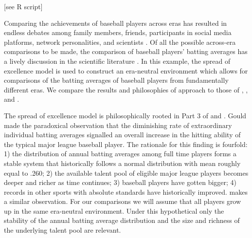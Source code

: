 \documentclass[11pt]{article}
\begin{document}
[see R script] \vspace{0.5cm}

Comparing the achievements of baseball players across eras has resulted in endless debates among family members, friends, participants in social media platforms, network personalities, and scientists \citep{gould1996full, berry1999bridging, schell2005baseball, petersen2011methods, eck2020challenging}. Of all the possible across-era comparisons to be made, the comparison of baseball players' batting averages has a lively discussion in the scientific literature \citep{gould1996full, berry1999bridging, schell2005baseball}. In this example, the spread of excellence model is used to construct an era-neutral environment which allows for comparisons of the batting averages of baseball players from fundamentally different eras. We compare the results and philosophies of approach to those of \cite{gould1996full}, \cite{berry1999bridging}, \cite{schell2005baseball} and \cite{petersen2011methods}.

The spread of excellence model is philosophically rooted in Part 3 of \cite{gould1996full} and \cite{eck2020challenging}. Gould made the paradoxical observation that the diminishing rate of extraordinary individual batting averages signalled an overall increase in the hitting ability of the typical major league baseball player. The rationale for this finding is fourfold: 1) the distribution of annual batting averages among full time players forms a stable system that historically follows a normal distribution with mean roughly equal to .260; 2) the available talent pool of eligible major league players becomes deeper and richer as time continues; 3) baseball players have gotten bigger; 4) records in other sports with absolute standards have historically improved. \cite{schell2005baseball} makes a similar observation. For our comparisons we will assume that all players grow up in the same era-neutral environment. Under this hypothetical only the stability of the annual batting average distribution and the size and richness of the underlying talent pool are relevant. 
\end{document}

